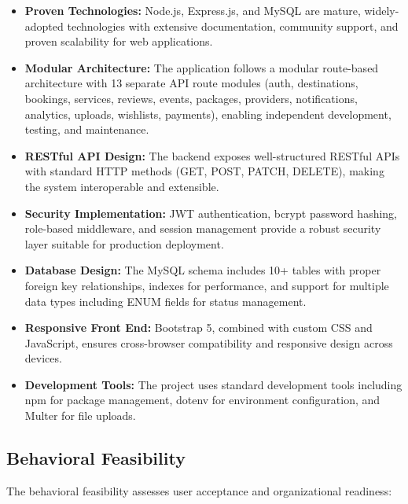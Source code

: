 \begin{itemize}[leftmargin=2em]
    \item \textbf{Proven Technologies:} Node.js, Express.js, and MySQL are mature, widely-adopted technologies with extensive documentation, community support, and proven scalability for web applications.
    \item \textbf{Modular Architecture:} The application follows a modular route-based architecture with 13 separate API route modules (auth, destinations, bookings, services, reviews, events, packages, providers, notifications, analytics, uploads, wishlists, payments), enabling independent development, testing, and maintenance.
    \item \textbf{RESTful API Design:} The backend exposes well-structured RESTful APIs with standard HTTP methods (GET, POST, PATCH, DELETE), making the system interoperable and extensible.
    \item \textbf{Security Implementation:} JWT authentication, bcrypt password hashing, role-based middleware, and session management provide a robust security layer suitable for production deployment.
    \item \textbf{Database Design:} The MySQL schema includes 10+ tables with proper foreign key relationships, indexes for performance, and support for multiple data types including ENUM fields for status management.
    \item \textbf{Responsive Front End:} Bootstrap 5, combined with custom CSS and JavaScript, ensures cross-browser compatibility and responsive design across devices.
    \item \textbf{Development Tools:} The project uses standard development tools including npm for package management, dotenv for environment configuration, and Multer for file uploads.
\end{itemize}

\subsection{Behavioral Feasibility}

The behavioral feasibility assesses user acceptance and organizational readiness:

